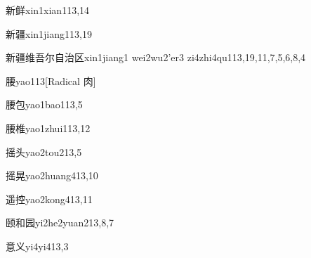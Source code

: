 \begin{verbete}{新鲜}{xin1xian1}{13,14}
\end{verbete}

\begin{verbete}{新疆}{xin1jiang1}{13,19}
\end{verbete}

\begin{verbete}{新疆维吾尔自治区}{xin1jiang1 wei2wu2'er3 zi4zhi4qu1}{13,19,11,7,5,6,8,4}
\end{verbete}

\begin{verbete}{腰}{yao1}{13}[Radical 肉]
\end{verbete}

\begin{verbete}{腰包}{yao1bao1}{13,5}
\end{verbete}

\begin{verbete}{腰椎}{yao1zhui1}{13,12}
\end{verbete}

\begin{verbete}{摇头}{yao2tou2}{13,5}
\end{verbete}

\begin{verbete}{摇晃}{yao2huang4}{13,10}
\end{verbete}

\begin{verbete}{遥控}{yao2kong4}{13,11}
\end{verbete}

\begin{verbete}{颐和园}{yi2he2yuan2}{13,8,7}
\end{verbete}

\begin{verbete}{意义}{yi4yi4}{13,3}
\end{verbete}

